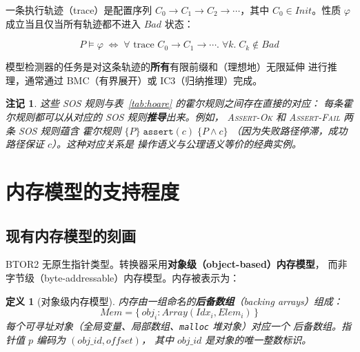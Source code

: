 \documentclass[11pt,a4paper]{article}
\newtheorem{definition}{定义}[section]
\newtheorem{remark}{注记}[section]
\newcommand{\Init}{\mathit{Init}}
\newcommand{\Bad}{\mathit{Bad}}
\begin{document}
一条执行轨迹（trace）是配置序列 $C_0 \to C_1 \to C_2 \to \cdots$，其中
$C_0 \in \Init$。性质 $\varphi$ 成立当且仅当所有轨迹都不进入 $\Bad$ 状态：

\[
  P \models \varphi \;\iff\; \forall \text{ trace } C_0 \to C_1 \to \cdots
  .\; \forall k.\; C_k \notin \Bad
\]

模型检测器的任务是对这条轨迹的\textbf{所有}有限前缀和（理想地）无限延伸
进行推理，通常通过 BMC（有界展开）或 IC3（归纳推理）完成。

\begin{remark}
  这些 SOS 规则与表~\ref{tab:hoare} 的霍尔规则之间存在直接的对应：
  每条霍尔规则都可以从对应的 SOS 规则\textbf{推导}出来。例如，
  \textsc{Assert-Ok} 和 \textsc{Assert-Fail} 两条 SOS 规则蕴含
  霍尔规则 $\{P\}\;\texttt{assert}(c)\;\{P \wedge c\}$
  （因为失败路径停滞，成功路径保证 $c$）。这种对应关系是
  \emph{操作语义与公理语义等价}的经典实例。
\end{remark}

\section{内存模型的支持程度}
\label{sec:memory-model}

\subsection{现有内存模型的刻画}

BTOR2 无原生指针类型。转换器采用\textbf{对象级（object-based）内存模型}，
而非字节级（byte-addressable）内存模型。内存被表示为：

\begin{definition}[对象级内存模型]
  内存由一组命名的\textbf{后备数组}（backing arrays）组成：
  \[
    \mathit{Mem} = \{\, \mathit{obj}_i : \mathit{Array}(\mathit{Idx}_i, \mathit{Elem}_i) \,\}
  \]
  每个可寻址对象（全局变量、局部数组、\texttt{malloc} 堆对象）对应一个
  后备数组。指针值 $p$ 编码为 $(\mathit{obj\_id}, \mathit{offset})$，
  其中 $\mathit{obj\_id}$ 是对象的唯一整数标识。
\end{definition}
\end{document}
